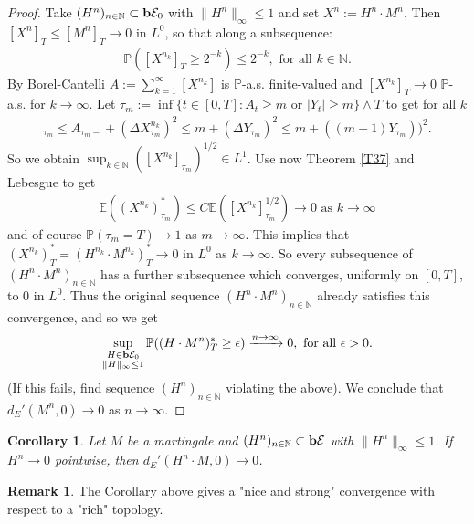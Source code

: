 \documentclass[12pt,a4paper, twoside]{article}
\newtheorem{cor}{Corollary}[section]
\theoremstyle{definition}
\newtheorem{rem}{Remark}[section]
\newcommand{\EE}{\mathbb{E}} %
\newcommand{\PP}{\mathbb{P}} %
\newcommand{\simple}{\textbf{\text{b}}\mathcal{E}}
\begin{document}
\begin{proof}
Take $(H^n)_{n \in \mathbb{N}} \subset \simple_0$ with $\|H^n\|_\infty \leq 1$ and set $X^n:= H^n \cdot M^n$. Then $[X^n]_T \leq [M^n]_T \to 0$ in $L^0$, so that along a subsequence:
\begin{align*}
\PP([X^{n_k}]_T \geq 2^{-k}) \leq 2^{-k}, \text{ for all } k \in \mathbb{N}.
\end{align*}
By Borel-Cantelli $A:= \sum_{k=1}^\infty [X^{n_k}]$ is $\PP$-a.s. finite-valued and $[X^{n_k}]_T \to 0$ $\PP$-a.s. for $k \to \infty$. Let $\tau_m := \inf \{ t \in [0,T]: A_t \geq m \text{ or } |Y_t| \geq m \} \wedge T$ to get for all $k$
\begin{align*}
[X^{n_k}]_{\tau_m} \leq A_{\tau_m-} + ( \Delta X_{\tau_m}^{n_k})^2 \leq m + ( \Delta Y_{\tau_m})^2 \leq m + ((m+1) Y_{\tau_m}))^2.
\end{align*}
So we obtain $\sup_{k \in \mathbb{N}} ( [X^{n_k}]_{\tau_m})^{1/2} \in L^1$. Use now Theorem \ref{T37} and Lebesgue to get  
\begin{align*}
\EE( (X^{n_k})_{\tau_m}^*) \leq C \EE( [X^{n_k}]_{\tau_m}^{1/2}) \to 0 \text{ as } k \to \infty
\end{align*}
and of course $\PP( \tau_m = T) \to 1$ as $m \to \infty$. This implies that $(X^{n_k})_T^* = (H^{n_k} \cdot M^{n_k}) _T ^* \to 0$ in $L^0$ as $k \to \infty$. So every subsequence of $(H^n \cdot M^n)_{n \in \mathbb{N}}$ has a further subsequence which converges, uniformly on $[0,T]$, to $0$ in $L^0$. Thus the original sequence $(H^n \cdot M^n)_{n \in \mathbb{N}}$ already satisfies this convergence, and so we get 
\begin{align*}
\sup_{\substack{ H \in \simple_0 \\ \|H\|_\infty \leq 1}} \PP( (H \cdot M^n)_T^* \geq \epsilon) \xrightarrow{n \to \infty} 0, \text{ for all } \epsilon >0. 
\end{align*}
(If this fails, find sequence $(H^n)_{n \in \mathbb{N}}$ violating the above). We conclude that $d_E'(M^n,0) \to 0$ as $n \to \infty$. 
\end{proof}
\begin{cor}\label{C311} Let $M$ be a martingale and $(H^n)_{n \in \mathbb{N}} \subset \simple$ with $\|H^n\|_\infty \leq 1$. If $H^n \to 0$ pointwise, then $d_E' (H^n \cdot M, 0) \to 0$. 
\end{cor}
\begin{rem} The Corollary above gives a "nice and strong" convergence with respect to a "rich" topology.
\end{rem}
\end{document}
